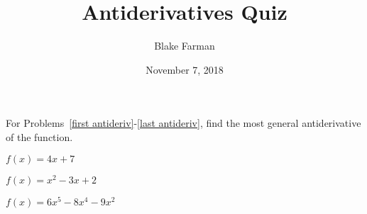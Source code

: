 \documentclass[10pt]{amsart}
\title{Antiderivatives Quiz}
\date{November 7, 2018}
\author{Blake Farman}
\begin{document}
\maketitle

\makenameslot

For Problems~\eqref{first antideriv}-\eqref{last antideriv}, find the most general antiderivative of the function.

\begin{thm}\label{first antideriv}
  \(f(x) = 4x + 7\)
\end{thm}

\vspace{1.25in}

\begin{thm}
  \(f(x) = x^2 - 3x + 2\)
\end{thm}
\vspace{1.25in}

\begin{thm}\label{last antideriv}
  \(f(x) = 6x^5 - 8x^4 - 9x^2\)
\end{thm}
\end{document}
